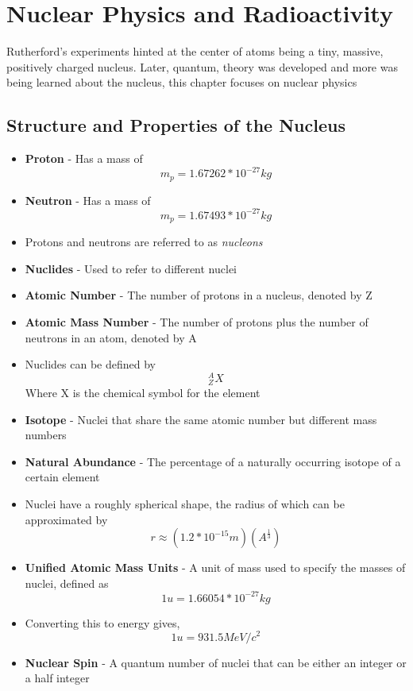 \section{Nuclear Physics and Radioactivity}
Rutherford's experiments hinted at the center of atoms being a tiny, massive, positively charged nucleus. Later, quantum, theory was developed and more was being learned about the nucleus, this chapter focuses on nuclear physics

\subsection{Structure and Properties of the Nucleus}
\begin{itemize}
    \item \textbf{Proton} - Has a mass of \[m_p=1.67262*10^{-27}kg\]
    \item \textbf{Neutron} - Has a mass of \[m_p=1.67493*10^{-27}kg\]
    \item Protons and neutrons are referred to as \emph{nucleons}
    \item \textbf{Nuclides} - Used to refer to different nuclei
    \item \textbf{Atomic Number} - The number of protons in a nucleus, denoted by Z
    \item \textbf{Atomic Mass Number} - The number of protons plus the number of neutrons in an atom, denoted by A
    \item Nuclides can be defined by \[^A_ZX\] Where X is the chemical symbol for the element
    \item \textbf{Isotope} - Nuclei that share the same atomic number but different mass numbers
    \item \textbf{Natural Abundance} - The percentage of a naturally occurring isotope of a certain element
    \item Nuclei have a roughly spherical shape, the radius of which can be approximated by \[r\approx (1.2*10^{-15}m)(A^{\frac{1}{3}})\]
    \item \textbf{Unified Atomic Mass Units} - A unit of mass used to specify the masses of nuclei, defined as \[1u=1.66054*10^{-27}kg\]
    \item Converting this to energy gives, \[1u=931.5MeV/c^2\]
    \item \textbf{Nuclear Spin} - A quantum number of nuclei that can be either an integer or a half integer
\end{itemize}

